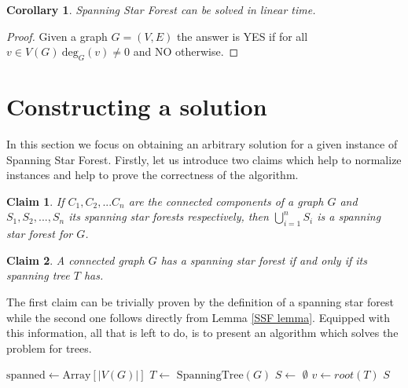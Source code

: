 \documentclass[en]{pracamgr}
\newtheorem{claim}{Claim}
\newtheorem{corollary}{Corollary}
\newcommand{\ssf}{spanning star forest}
\newcommand{\ssfp}{{\sc Spanning Star Forest}}
\newcommand{\degree}[2]{\textrm{deg}_{#1}(#2)}
\begin{document}
\begin{corollary}
	\ssfp{} can be solved in linear time.
\end{corollary}

\begin{proof}
	Given a graph $G = (V,E)$ the answer is YES if for all $v \in V(G)\ \degree{G}{v} \neq 0$ and NO otherwise.
\end{proof}

\section{Constructing a solution}

In this section we focus on obtaining an arbitrary solution for a given instance of \ssfp{}. Firstly, let us introduce two claims which help to normalize instances and help to prove the correctness of the algorithm.

\begin{claim} \label{SSF sum}
	If $C_1,C_2,...C_n$ are the connected components of a graph $G$ and $S_1,S_2,...,S_n$ its \ssf{}s respectively, then $\bigcup\limits_{i=1}^n S_i$ is a \ssf{} for $G$.
\end{claim}

\begin{claim} \label{Spanning tree SSF}
	A connected graph $G$ has a \ssf{} if and only if its spanning tree $T$ has.
\end{claim}

The first claim can be trivially proven by the definition of a \ssf{} while the second one follows directly from Lemma \ref{SSF lemma}. Equipped with this information, all that is left to do, is to present an algorithm which solves the problem for trees.

\begin{algorithm}\label{alg1}
	\KwOut{\ssf{} of $G$}
	$\textrm{spanned} \leftarrow \textrm{Array}[|V(G)|]$\; 
	$T \leftarrow$ $\textrm{SpanningTree}(G)$\;
	$S \leftarrow$ $\emptyset$\;
	$v \leftarrow root(T)$\;
	\Return $S$\;
	\caption{Obtaining a spanning star forest from a connected graph.}
\end{algorithm}
\end{document}
